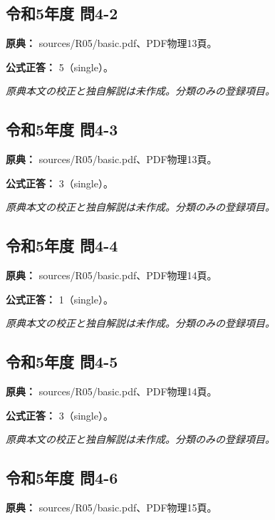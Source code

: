 \subsection{令和5年度 問4-2}
\label{q:r05-reg-basic-4-2}

\noindent\textbf{原典：} sources/R05/basic.pdf、PDF物理13頁。

\textbf{公式正答：} 5（single）。

\par\textit{原典本文の校正と独自解説は未作成。分類のみの登録項目。}

\subsection{令和5年度 問4-3}
\label{q:r05-reg-basic-4-3}

\noindent\textbf{原典：} sources/R05/basic.pdf、PDF物理13頁。

\textbf{公式正答：} 3（single）。

\par\textit{原典本文の校正と独自解説は未作成。分類のみの登録項目。}

\subsection{令和5年度 問4-4}
\label{q:r05-reg-basic-4-4}

\noindent\textbf{原典：} sources/R05/basic.pdf、PDF物理14頁。

\textbf{公式正答：} 1（single）。

\par\textit{原典本文の校正と独自解説は未作成。分類のみの登録項目。}

\subsection{令和5年度 問4-5}
\label{q:r05-reg-basic-4-5}

\noindent\textbf{原典：} sources/R05/basic.pdf、PDF物理14頁。

\textbf{公式正答：} 3（single）。

\par\textit{原典本文の校正と独自解説は未作成。分類のみの登録項目。}

\subsection{令和5年度 問4-6}
\label{q:r05-reg-basic-4-6}

\noindent\textbf{原典：} sources/R05/basic.pdf、PDF物理15頁。

